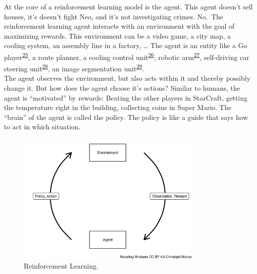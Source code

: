 \documentclass[
  10pt,
]{scrbook}
\begin{document}
At the core of a reinforcement learning model is the agent.
This agent doesn't sell houses, it's doesn't fight Neo, and it's not investigating crimes.
No.~The reinforcement learning agent interacts with an environment with the goal of maximizing rewards.
This environment can be a video game, a city map, a cooling system, an assembly line in a factory, \ldots{}
The agent is an entity like a Go player\textsuperscript{\protect\hyperlink{ref-silver2016mastering}{25}}, a route planner, a cooling control unit\textsuperscript{\protect\hyperlink{ref-li2019transforming}{26}}, robotic arm\textsuperscript{\protect\hyperlink{ref-gu2017deep}{27}}, self-driving car steering unit\textsuperscript{\protect\hyperlink{ref-kiran2021deep}{28}}, an image segmentation unit\textsuperscript{\protect\hyperlink{ref-wang2018outline}{29}}.\\
The agent observes the environment, but also acts within it and thereby possibly change it.
But how does the agent choose it's actions?
Similar to humans, the agent is ``motivated'' by rewards:
Beating the other players in StarCraft, getting the temperature right in the building, collecting coins in Super Mario.
The ``brain'' of the agent is called the policy.
The policy is like a guide that says how to act in which situation.

\begin{figure}

{\centering \includegraphics[width=0.8\textwidth]{figures/rl-1} 

}

\caption{Reinforcement Learning.}\label{fig:rl}
\end{figure}
\end{document}
